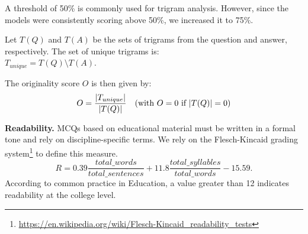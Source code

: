 \documentclass[11pt]{article}
\begin{document}
    A threshold of 50\% is commonly used for trigram analysis. However, since the models were consistently scoring above 50\%, we increased it to 75\%.

    Let \( T(Q) \) and \( T(A) \) be the sets of trigrams from the question and answer, respectively. The set of unique trigrams is:\\
    $T_{unique} = T(Q) \setminus T(A)$.
    
    The originality score \( O \) is then given by:
    \[
    O = \frac{| T_{unique} |}{| T(Q) |} \quad \text{(with \( O = 0 \) if \( \left| T(Q) \right| = 0 \))}
    \]
  
{\bf Readability.}
    MCQs based on educational material must be written in a formal tone and rely on discipline-specific terms. We rely on the Flesch-Kincaid grading system\footnote{\url{https://en.wikipedia.org/wiki/Flesch-Kincaid_readability_tests}} to define this measure. 
    \[
         R = 0.39\frac{total\_words}{total\_sentences}+11.8\frac{total\_syllables}{total\_words}-15.59.
    \]
    According to common practice in Education, a value greater than 12 indicates readability at the college level.
\end{document}
